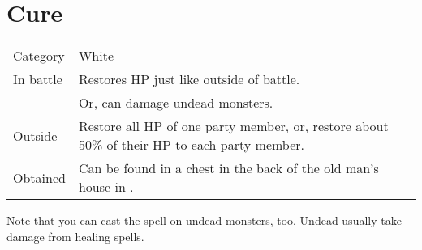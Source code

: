 \section{Cure}
\label{spell:cure}


\noindent\begin{tabularx}{\textwidth}[l]{lX}
	Category
	& White
\\
	In battle
	& Restores HP just like outside of battle. \\ 
	& Or, can damage undead monsters.
\\
	Outside
	& Restore all HP of one party member, or, restore about 50\% of their HP to each party member.
\\
	Obtained
	& Can be found in a chest in the back of the old man’s house in \nameref{map:foresta}.
\end{tabularx}

Note that you can cast the spell on undead monsters, too. Undead usually take damage from healing spells. 
